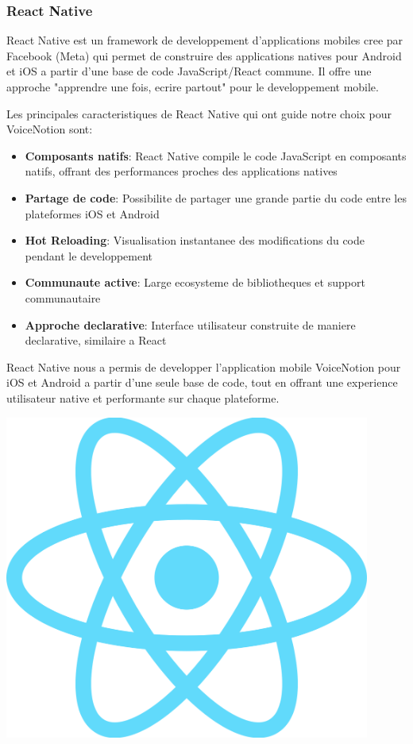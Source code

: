 \subsubsection{React Native}
\begin{minipage}{0.7\textwidth}
React Native est un framework de developpement d'applications mobiles cree par Facebook (Meta) qui permet de construire des applications natives pour Android et iOS a partir d'une base de code JavaScript/React commune. Il offre une approche "apprendre une fois, ecrire partout" pour le developpement mobile.

Les principales caracteristiques de React Native qui ont guide notre choix pour VoiceNotion sont:

\begin{itemize}
    \item \textbf{Composants natifs}: React Native compile le code JavaScript en composants natifs, offrant des performances proches des applications natives
    \item \textbf{Partage de code}: Possibilite de partager une grande partie du code entre les plateformes iOS et Android
    \item \textbf{Hot Reloading}: Visualisation instantanee des modifications du code pendant le developpement
    \item \textbf{Communaute active}: Large ecosysteme de bibliotheques et support communautaire
    \item \textbf{Approche declarative}: Interface utilisateur construite de maniere declarative, similaire a React
\end{itemize}

React Native nous a permis de developper l'application mobile VoiceNotion pour iOS et Android a partir d'une seule base de code, tout en offrant une experience utilisateur native et performante sur chaque plateforme.
\end{minipage}%
\hfill
\begin{minipage}{0.25\textwidth}
\centering
\includegraphics[width=0.9\textwidth]{assets/docs/logo_reactnative.png}
\end{minipage}

